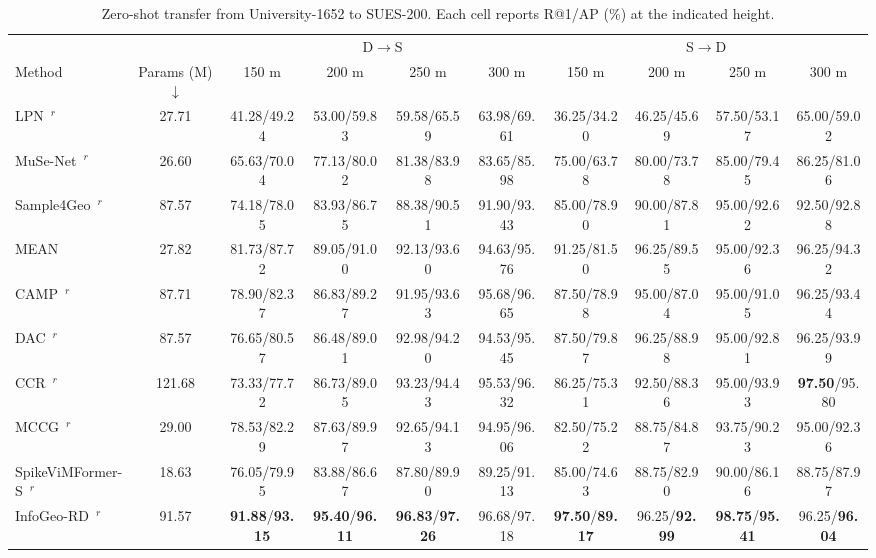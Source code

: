 \begin{table}[t]
\centering
\caption{Zero-shot transfer from University-1652 to SUES-200. Each cell reports R@1/AP (\%) at the indicated height.}
\label{tab:transfer}
\scriptsize
\setlength{\tabcolsep}{1.5pt}
\begin{tabular*}{\textwidth}{@{\extracolsep{\fill}}lc*{8}{c}@{}}
\toprule
& & \multicolumn{4}{c}{D$\rightarrow$S} & \multicolumn{4}{c}{S$\rightarrow$D} \\
\cmidrule(lr){3-6}\cmidrule(lr){7-10}
Method & Params (M)$\downarrow$ & 150 m & 200 m & 250 m & 300 m & 150 m & 200 m & 250 m & 300 m \\
\midrule
LPN~\cite{wang2022lpn}$^{r}$ & 27.71 & 41.28/49.24 & 53.00/59.83 & 59.58/65.59 & 63.98/69.61 & 36.25/34.20 & 46.25/45.69 & 57.50/53.17 & 65.00/59.02 \\
MuSe-Net~\cite{wang2024musenet}$^{r}$ & 26.60 & 65.63/70.04 & 77.13/80.02 & 81.38/83.98 & 83.65/85.98 & 75.00/63.78 & 80.00/73.78 & 85.00/79.45 & 86.25/81.06 \\
Sample4Geo~\cite{deuser2023sample4geo}$^{r}$ & 87.57 & 74.18/78.05 & 83.93/86.75 & 88.38/90.51 & 91.90/93.43 & 85.00/78.90 & 90.00/87.81 & 95.00/92.62 & 92.50/92.88 \\
MEAN~\cite{chen2025mean} & 27.82 & 81.73/87.72 & 89.05/91.00 & 92.13/93.60 & 94.63/95.76 & 91.25/81.50 & 96.25/89.55 & 95.00/92.36 & 96.25/94.32 \\
CAMP~\cite{wu2024camp}$^{r}$ & 87.71 & 78.90/82.37 & 86.83/89.27 & 91.95/93.63 & 95.68/96.65 & 87.50/78.98 & 95.00/87.04 & 95.00/91.05 & 96.25/93.44 \\
DAC~\cite{xia2024dac}$^{r}$ & 87.57 & 76.65/80.57 & 86.48/89.01 & 92.98/94.20 & 94.53/95.45 & 87.50/79.87 & 96.25/88.98 & 95.00/92.81 & 96.25/93.99 \\
CCR~\cite{du2024ccr}$^{r}$ & 121.68 & 73.33/77.72 & 86.73/89.05 & 93.23/94.43 & 95.53/96.32 & 86.25/75.31 & 92.50/88.36 & 95.00/93.93 & \textbf{97.50}/95.80 \\
MCCG~\cite{shen2024mccg}$^{r}$ & 29.00 & 78.53/82.29 & 87.63/89.97 & 92.65/94.13 & 94.95/96.06 & 82.50/75.22 & 88.75/84.87 & 93.75/90.23 & 95.00/92.36 \\
SpikeViMFormer-S~\cite{chen2026spikevimformer}$^{r}$ & 18.63 & 76.05/79.95 & 83.88/86.67 & 87.80/89.90 & 89.25/91.13 & 85.00/74.63 & 88.75/82.90 & 90.00/86.16 & 88.75/87.97 \\
InfoGeo-RD~\cite{zhang2026infogeo}$^{r}$ & 91.57 & \textbf{91.88}/\textbf{93.15} & \textbf{95.40}/\textbf{96.11} & \textbf{96.83}/\textbf{97.26} & 96.68/97.18 & \textbf{97.50}/\textbf{89.17} & 96.25/\textbf{92.99} & \textbf{98.75}/\textbf{95.41} & 96.25/\textbf{96.04} \\

\end{tabular*}
\end{table}
